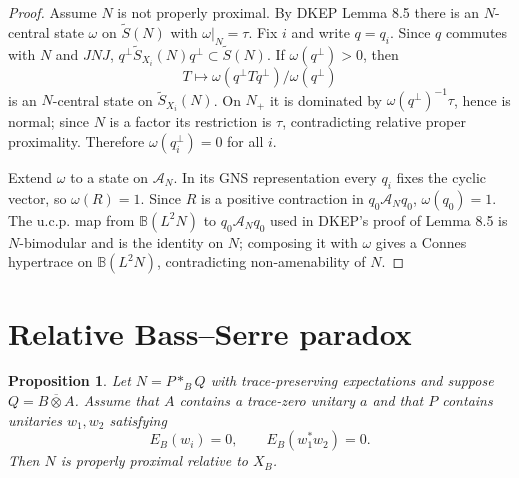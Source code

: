 \documentclass[12pt]{article}
\newtheorem{proposition}{Proposition}
\newcommand{\bbarotimes}{\mathbin{\overline{\otimes}}}
\newcommand{\cA}{\mathcal A}
\begin{document}
\begin{proof}
Assume \(N\) is not properly proximal.  By DKEP Lemma 8.5 there is an
\(N\)-central state \(\omega\) on \(\widetilde S(N)\) with
\(\omega|_N=\tau\).  Fix \(i\) and write \(q=q_i\).  Since \(q\) commutes with
\(N\) and \(JNJ\), \(q^\perp\widetilde S_{X_i}(N)q^\perp\subset\widetilde S(N)\).
If \(\omega(q^\perp)>0\), then
\[
        T\mapsto \omega(q^\perp Tq^\perp)/\omega(q^\perp)
\]
is an \(N\)-central state on \(\widetilde S_{X_i}(N)\).  On \(N_+\) it is
dominated by \(\omega(q^\perp)^{-1}\tau\), hence is normal; since \(N\) is a
factor its restriction is \(\tau\), contradicting relative proper proximality.
Therefore \(\omega(q_i^\perp)=0\) for all \(i\).

Extend \(\omega\) to a state on \(\cA_N\).  In its GNS representation every
\(q_i\) fixes the cyclic vector, so \(\omega(R)=1\).  Since \(R\) is a positive
contraction in \(q_0\cA_Nq_0\), \(\omega(q_0)=1\).  The u.c.p. map from
\(\mathbb B(L^2N)\) to \(q_0\cA_Nq_0\) used in DKEP's proof of Lemma 8.5 is
\(N\)-bimodular and is the identity on \(N\); composing it with \(\omega\) gives
a Connes hypertrace on \(\mathbb B(L^2N)\), contradicting non-amenability of
\(N\).
\end{proof}

\section*{Relative Bass--Serre paradox}

\begin{proposition}\label{prop:BS}
Let \(N=P*_{B}Q\) with trace-preserving expectations and suppose
\(Q=B\bbarotimes A\).  Assume that \(A\) contains a trace-zero unitary \(a\) and
that \(P\) contains unitaries \(w_1,w_2\) satisfying
\[
        E_B(w_i)=0,\qquad E_B(w_1^*w_2)=0 .
\]
Then \(N\) is properly proximal relative to \(X_B\).
\end{proposition}
\end{document}
